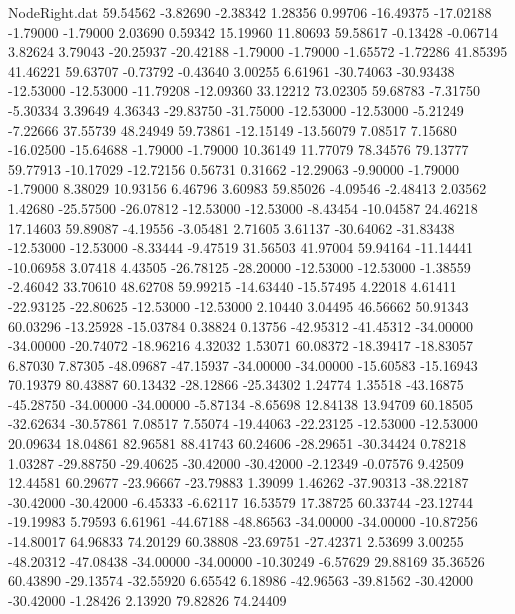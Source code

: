 \begin{filecontents}{NodeRight.dat}
  59.54562   -3.82690   -2.38342     1.28356    0.99706  -16.49375  -17.02188   -1.79000   -1.79000    2.03690    0.59342   15.19960   11.80693
  59.58617   -0.13428   -0.06714     3.82624    3.79043  -20.25937  -20.42188   -1.79000   -1.79000   -1.65572   -1.72286   41.85395   41.46221
  59.63707   -0.73792   -0.43640     3.00255    6.61961  -30.74063  -30.93438  -12.53000  -12.53000  -11.79208  -12.09360   33.12212   73.02305
  59.68783   -7.31750   -5.30334     3.39649    4.36343  -29.83750  -31.75000  -12.53000  -12.53000   -5.21249   -7.22666   37.55739   48.24949
  59.73861  -12.15149  -13.56079     7.08517    7.15680  -16.02500  -15.64688   -1.79000   -1.79000   10.36149   11.77079   78.34576   79.13777
  59.77913  -10.17029  -12.72156     0.56731    0.31662  -12.29063   -9.90000   -1.79000   -1.79000    8.38029   10.93156    6.46796    3.60983
  59.85026   -4.09546   -2.48413     2.03562    1.42680  -25.57500  -26.07812  -12.53000  -12.53000   -8.43454  -10.04587   24.46218   17.14603
  59.89087   -4.19556   -3.05481     2.71605    3.61137  -30.64062  -31.83438  -12.53000  -12.53000   -8.33444   -9.47519   31.56503   41.97004
  59.94164  -11.14441  -10.06958     3.07418    4.43505  -26.78125  -28.20000  -12.53000  -12.53000   -1.38559   -2.46042   33.70610   48.62708
  59.99215  -14.63440  -15.57495     4.22018    4.61411  -22.93125  -22.80625  -12.53000  -12.53000    2.10440    3.04495   46.56662   50.91343
  60.03296  -13.25928  -15.03784     0.38824    0.13756  -42.95312  -41.45312  -34.00000  -34.00000  -20.74072  -18.96216    4.32032    1.53071
  60.08372  -18.39417  -18.83057     6.87030    7.87305  -48.09687  -47.15937  -34.00000  -34.00000  -15.60583  -15.16943   70.19379   80.43887
  60.13432  -28.12866  -25.34302     1.24774    1.35518  -43.16875  -45.28750  -34.00000  -34.00000   -5.87134   -8.65698   12.84138   13.94709
  60.18505  -32.62634  -30.57861     7.08517    7.55074  -19.44063  -22.23125  -12.53000  -12.53000   20.09634   18.04861   82.96581   88.41743
  60.24606  -28.29651  -30.34424     0.78218    1.03287  -29.88750  -29.40625  -30.42000  -30.42000   -2.12349   -0.07576    9.42509   12.44581
  60.29677  -23.96667  -23.79883     1.39099    1.46262  -37.90313  -38.22187  -30.42000  -30.42000   -6.45333   -6.62117   16.53579   17.38725
  60.33744  -23.12744  -19.19983     5.79593    6.61961  -44.67188  -48.86563  -34.00000  -34.00000  -10.87256  -14.80017   64.96833   74.20129
  60.38808  -23.69751  -27.42371     2.53699    3.00255  -48.20312  -47.08438  -34.00000  -34.00000  -10.30249   -6.57629   29.88169   35.36526
  60.43890  -29.13574  -32.55920     6.65542    6.18986  -42.96563  -39.81562  -30.42000  -30.42000   -1.28426    2.13920   79.82826   74.24409

\end{filecontents}
